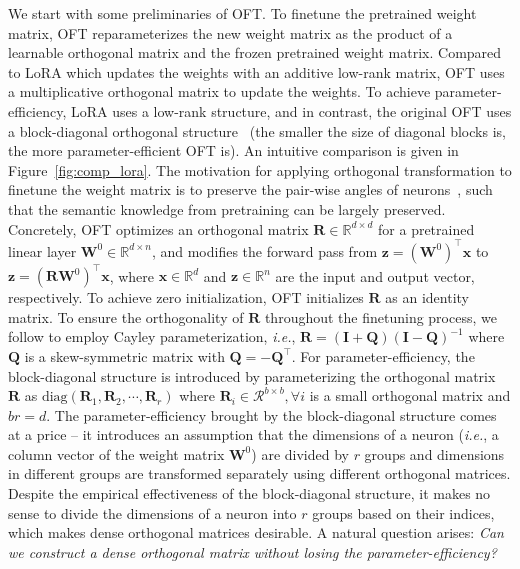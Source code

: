 \documentclass{article} %
\newcommand{\ie}{\emph{i.e.}}
\begin{document}
We start with some preliminaries of OFT. To finetune the pretrained weight matrix, OFT reparameterizes the new weight matrix as the product of a learnable orthogonal matrix and the frozen pretrained weight matrix. Compared to LoRA which updates the weights with an additive low-rank matrix, OFT uses a multiplicative orthogonal matrix to update the weights. To achieve parameter-efficiency, LoRA uses a low-rank structure, and in contrast, the original OFT uses a block-diagonal orthogonal structure~\cite{qiu2023controlling} (the smaller the size of diagonal blocks is, the more parameter-efficient OFT is). An intuitive comparison is given in Figure~\ref{fig:comp_lora}. The motivation for applying orthogonal transformation to finetune the weight matrix is to preserve the pair-wise angles of neurons~\cite{liu2018learning,liu2021orthogonal,qiu2023controlling}, such that the semantic knowledge from pretraining can be largely preserved. Concretely, OFT optimizes an orthogonal matrix $\bm{R}\in\mathbb{R}^{d\times d}$ for a pretrained linear layer $\bm{W}^0\in\mathbb{R}^{d\times n}$, and modifies the forward pass from $\bm{z}=(\bm{W}^0)^\top\bm{x}$ to $\bm{z}=(\bm{R}\bm{W}^0)^\top\bm{x}$, where $\bm{x}\in\mathbb{R}^{d}$ and $\bm{z}\in\mathbb{R}^{n}$ are the input and output vector, respectively. To achieve zero initialization, OFT initializes $\bm{R}$ as an identity matrix. To ensure the orthogonality of $\bm{R}$ throughout the finetuning process, we follow \cite{qiu2023controlling,liu2021orthogonal} to employ Cayley parameterization, \ie, $\bm{R}=(\bm{I}+\bm{Q})(\bm{I}-\bm{Q})^{-1}$ where $\bm{Q}$ is a skew-symmetric matrix with $\bm{Q}=-\bm{Q}^\top$. For parameter-efficiency, the block-diagonal structure is introduced by parameterizing the orthogonal matrix $\bm{R}$ as $\text{diag}(\bm{R}_1,\bm{R}_2,\cdots,\bm{R}_r)$ where $\bm{R}_i\in\mathcal{R}^{b\times b},\forall i$ is a small orthogonal matrix and $br=d$. The parameter-efficiency brought by the block-diagonal structure comes at a price -- it introduces an assumption that the dimensions of a neuron (\ie, a column vector of the weight matrix $\bm{W}^0$) are divided by $r$ groups and dimensions in different groups are transformed separately using different orthogonal matrices. Despite the empirical effectiveness of the block-diagonal structure, it makes no sense to divide the dimensions of a neuron into $r$ groups based on their indices, which makes dense orthogonal matrices desirable. A natural question arises: \emph{Can we construct a dense orthogonal matrix without losing the parameter-efficiency?}
\end{document}
